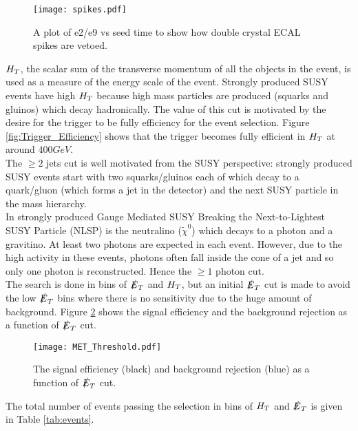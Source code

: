 \begin{figure}
\begin{center}
\texttt{[image: spikes.pdf]}
\end{center}
\caption{A plot of e2/e9 vs seed time to show how double crystal ECAL spikes are
vetoed.}
\label{fig:spikes}
\end{figure}

$H_{T}$, the scalar sum of the transverse momentum of all the objects in the 
event, is used as a measure of the energy scale of the event. Strongly produced 
SUSY events have high $H_{T}$ because high mass particles are produced (squarks
and gluinos) which decay hadronically. The value of this cut is motivated by the 
desire for the trigger to be fully efficiency for the event selection. Figure 
\ref{fig:Trigger_Efficiency} shows that the trigger becomes fully efficient in
$H_{T}$ at around $400\unit{GeV}$. \\

The $\geq 2$ jets cut is well motivated from the SUSY perspective: strongly
produced SUSY events start with two squarks/gluinos each of which decay to a 
quark/gluon (which forms a jet in the detector) and the next SUSY particle in 
the mass hierarchy. \\

In strongly produced Gauge Mediated SUSY Breaking the Next-to-Lightest SUSY 
Particle (NLSP) is the neutralino ($\tilde{\chi}^{0}$) which decays to a photon 
and a gravitino. At least two photons are expected in each event. However, due 
to the high activity in these events, photons often fall inside the cone of a 
jet and so only one photon is reconstructed. Hence the $\geq 1$ photon cut. \\

The search is done in bins of $\slashed{E}_{T}$ and $H_{T}$, but an initial $\slashed{E}_{T}$ cut is
made to avoid the low $\slashed{E}_{T}$ bins where there is no sensitivity due to the huge
amount of background. Figure \ref{fig:met_threshold} shows the signal efficiency
and the background rejection as a function of $\slashed{E}_{T}$ cut.

\begin{figure}
\begin{center}
\texttt{[image: MET\_Threshold.pdf]}
\end{center}
\caption{The signal efficiency (black) and background rejection (blue) as a
function of $\slashed{E}_{T}$ cut.}
\label{fig:met_threshold}
\end{figure}

The total number of events passing the selection in bins of $H_{T}$ and $\slashed{E}_{T}$ is
given in Table \ref{tab:events}.

